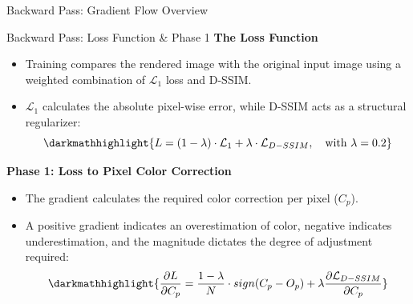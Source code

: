 \begin{frame}[label=gradient_flow]{Backward Pass: Gradient Flow Overview}
{%
    }
\end{frame}

\begin{frame}{Backward Pass: Loss Function \& Phase 1}
    \textbf{The Loss Function}
    \begin{itemize}
        \justifying
        \item Training compares the rendered image with the original input image using a weighted combination of $\mathcal{L}_1$ loss and D-SSIM.
        \item $\mathcal{L}_1$ calculates the absolute pixel-wise error, while D-SSIM acts as a structural regularizer:
        $$\darkmathhighlight{ L = (1-\lambda)\cdot\mathcal{L}_1 + \lambda\cdot\mathcal{L}_{D-SSIM}, \quad \text{with } \lambda=0.2 }$$
    \end{itemize}

    \pause
    \vspace{1em}

    \textbf{Phase 1: Loss to Pixel Color Correction}
    \begin{itemize}
        \justifying
        \item The gradient calculates the required color correction per pixel ($C_p$).
        \item A positive gradient indicates an overestimation of color, negative indicates underestimation, and the magnitude dictates the degree of adjustment required:
        $$\darkmathhighlight{ \frac{\partial L}{\partial C_p} = \frac{1-\lambda}{N} \cdot sign(C_p - O_p) + \lambda \frac{\partial \mathcal{L}_{D-SSIM}}{\partial C_p} }$$
    \end{itemize}
\end{frame}

